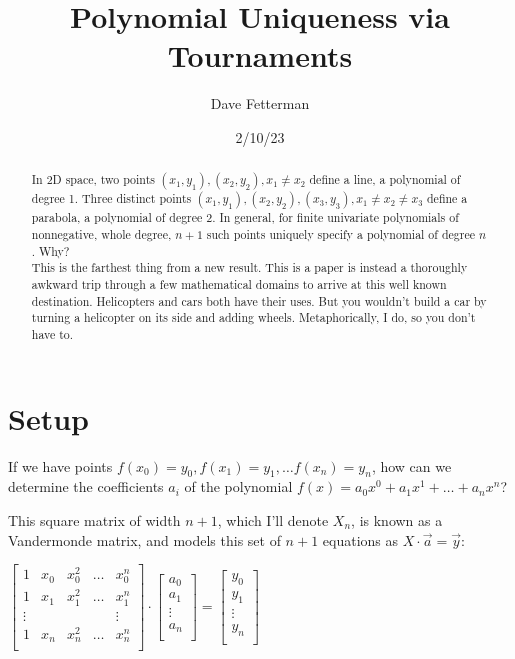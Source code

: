 \documentclass[11pt, oneside]{article} 	%
\title{Polynomial Uniqueness via Tournaments}
\author{Dave Fetterman}
\affil{Obviously Unemployed}
\date{2/10/23}
\begin{document}
\maketitle

\begin{abstract}

In 2D space, two points $(x_1, y_1), (x_2, y_2), x_1 \neq x_2$ define a line, a polynomial of degree 1.  Three distinct points $(x_1, y_1), (x_2, y_2), (x_3, y_3), x_1 \neq x_2 \neq x_3$ define a parabola, a polynomial of degree 2.  In general, for finite univariate polynomials of nonnegative, whole degree, $n+1$ such points uniquely specify a polynomial of degree $n$.  Why?
\\

This is the farthest thing from a new result. This is a paper is instead a thoroughly awkward trip through a few mathematical domains to arrive at this well known destination. Helicopters and cars both have their uses. But you wouldn't build a car by turning a helicopter on its side and adding wheels.  Metaphorically, I do, so you don't have to.

\end{abstract}

\section{Setup}

If we have points $f(x_0) = y_0, f(x_1) = y_1,  \ldots f(x_{n}) = y_{n}$, how can we determine the coefficients $a_i$ of the polynomial $f(x) = a_0x^0 + a_1x^1 + \ldots + a_nx^n$?

This square matrix of width $n+1$, which I'll denote $X_n$, is known as a Vandermonde matrix\cite{1}, and models this set of $n+1$ equations as $X \cdot \vec{a} = \vec{y}$:

 $\begin{bmatrix}
1 & x_0 & x_0^2 & \ldots & x_0^{n} \\
1 & x_1 & x_1^2 & \ldots & x_1^{n} \\
\vdots & & & & \vdots  \\
1 & x_{n} & x_{n}^2 & \ldots & x_{n}^{n} \\
\end{bmatrix}
\cdot 
\begin{bmatrix}
a_0 \\
a_1 \\
\vdots \\
a_n \\
\end{bmatrix}
=
\begin{bmatrix}
y_0 \\
y_1 \\
\vdots \\
y_{n} \\
\end{bmatrix}
$
\\
\end{document}

